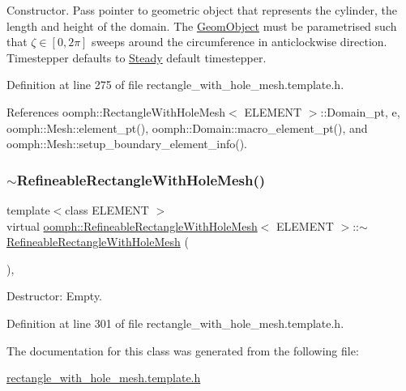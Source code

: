 Constructor. Pass pointer to geometric object that represents the cylinder, the length and height of the domain. The \hyperlink{classoomph_1_1GeomObject}{Geom\+Object} must be parametrised such that $\zeta \in [0,2\pi]$ sweeps around the circumference in anticlockwise direction. Timestepper defaults to \hyperlink{classoomph_1_1Steady}{Steady} default timestepper. 



Definition at line 275 of file rectangle\+\_\+with\+\_\+hole\+\_\+mesh.\+template.\+h.



References oomph\+::\+Rectangle\+With\+Hole\+Mesh$<$ E\+L\+E\+M\+E\+N\+T $>$\+::\+Domain\+\_\+pt, e, oomph\+::\+Mesh\+::element\+\_\+pt(), oomph\+::\+Domain\+::macro\+\_\+element\+\_\+pt(), and oomph\+::\+Mesh\+::setup\+\_\+boundary\+\_\+element\+\_\+info().

\mbox{\label{classoomph_1_1RefineableRectangleWithHoleMesh_a1a04b6a5da21108a50934c4909625cf1}} 
\subsubsection{\texorpdfstring{$\sim$\+Refineable\+Rectangle\+With\+Hole\+Mesh()}{~RefineableRectangleWithHoleMesh()}}
{\footnotesize\ttfamily template$<$class E\+L\+E\+M\+E\+NT $>$ \\
virtual \hyperlink{classoomph_1_1RefineableRectangleWithHoleMesh}{oomph\+::\+Refineable\+Rectangle\+With\+Hole\+Mesh}$<$ E\+L\+E\+M\+E\+NT $>$\+::$\sim$\hyperlink{classoomph_1_1RefineableRectangleWithHoleMesh}{Refineable\+Rectangle\+With\+Hole\+Mesh} (\begin{DoxyParamCaption}{ }\end{DoxyParamCaption})\hspace{0.3cm}{\ttfamily [inline]}, {\ttfamily [virtual]}}



Destructor\+: Empty. 



Definition at line 301 of file rectangle\+\_\+with\+\_\+hole\+\_\+mesh.\+template.\+h.



The documentation for this class was generated from the following file\+:\begin{DoxyCompactItemize}
\item 
\hyperlink{rectangle__with__hole__mesh_8template_8h}{rectangle\+\_\+with\+\_\+hole\+\_\+mesh.\+template.\+h}\end{DoxyCompactItemize}

